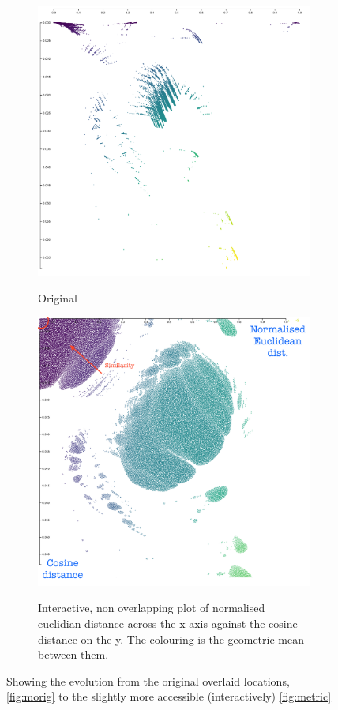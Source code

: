 \begin{figure}[H]
\begin{subfigure}[t]{.5\textwidth}
  \centering
  \includegraphics[width=\textwidth]{fig/metric-1.png}
  \label{fig:morig}
  \caption{Original}
\end{subfigure}%
\begin{subfigure}[t]{.5\textwidth}
\includegraphics[width=\textwidth]{fig/metric.png}
\label{fig:metric}
\caption{Interactive, non overlapping plot of normalised euclidian distance across the x axis against the cosine distance on the y. The colouring is the geometric mean between them.}
\end{subfigure}

\caption{Showing the evolution from the original overlaid locations, \autoref{fig:morig} to the slightly more accessible (interactively) \autoref{fig:metric}}
\end{figure}

